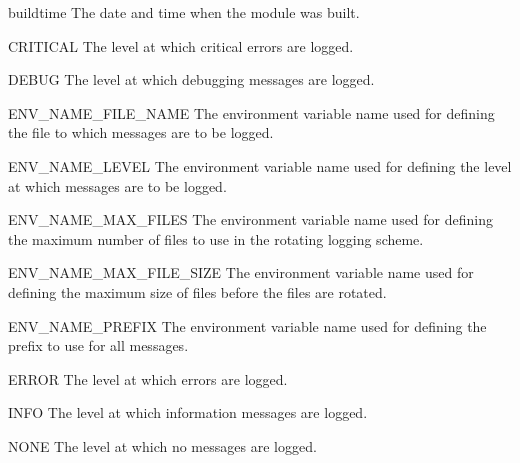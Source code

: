 \documentclass{manual}
\begin{document}
\begin{datadesc}{buildtime}
  The date and time when the module was built.
\end{datadesc}

\begin{datadesc}{CRITICAL}
  The level at which critical errors are logged.
\end{datadesc}

\begin{datadesc}{DEBUG}
  The level at which debugging messages are logged.
\end{datadesc}

\begin{datadesc}{ENV_NAME_FILE_NAME}
  The environment variable name used for defining the file to which messages
  are to be logged.
\end{datadesc}

\begin{datadesc}{ENV_NAME_LEVEL}
  The environment variable name used for defining the level at which messages
  are to be logged.
\end{datadesc}

\begin{datadesc}{ENV_NAME_MAX_FILES}
  The environment variable name used for defining the maximum number of files
  to use in the rotating logging scheme.
\end{datadesc}

\begin{datadesc}{ENV_NAME_MAX_FILE_SIZE}
  The environment variable name used for defining the maximum size of files
  before the files are rotated.
\end{datadesc}

\begin{datadesc}{ENV_NAME_PREFIX}
  The environment variable name used for defining the prefix to use for all
  messages.
\end{datadesc}

\begin{datadesc}{ERROR}
  The level at which errors are logged.
\end{datadesc}

\begin{datadesc}{INFO}
  The level at which information messages are logged.
\end{datadesc}

\begin{datadesc}{NONE}
  The level at which no messages are logged.
\end{datadesc}
\end{document}

